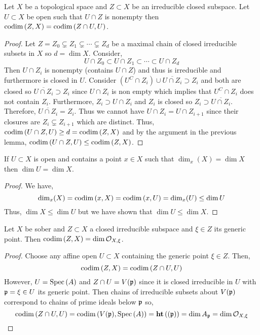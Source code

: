 \documentclass[12pt]{article}
\begin{document}
\begin{lemma}
Let $X$ be a topological space and $Z \subset X$ be an irreducible closed subspace. Let $U \subset X$ be open such that $U \cap Z$ is nonempty then $\mathrm{codim}\left( Z, X \right) = \mathrm{codim}\left( Z \cap U, U \right)$.
\end{lemma}

\begin{proof}
Let $Z = Z_0 \subsetneq Z_1 \subsetneq \cdots \subsetneq Z_d$ be a maximal chain of closed irreducible subsets in $X$ so $d = \dim{X}$. Consider,
\[ U \cap Z_0 \subset U \cap Z_1 \subset \cdots \subset U \cap Z_d \]
Then $U \cap Z_i$ is nonempty (contains $U \cap Z$) and thus is irreducible and furthermore is closed in $U$. Consider $(U^C \cap Z_i) \cup \overline{U \cap Z_i} \supset Z_i$ and both are closed so $\overline{U \cap Z_i} \supset Z_i$ since $U \cap Z_i$ is non empty which implies that $U^C \cap Z_i$ does not contain $Z_i$. Furthermore, $Z_i \supset U \cap Z_i$ and $Z_i$ is closed so $Z_i \supset \overline{U \cap Z_i}$. Therefore, $\overline{U \cap Z_i} = Z_i$. Thus we cannot have $U \cap Z_{i} = U \cap Z_{i+1}$ since their closures are $Z_i \subsetneq Z_{i+1}$ which are distinct. Thus, $\mathrm{codim}\left( U \cap Z, U \right) \ge d = \mathrm{codim}\left( Z, X \right)$ and by the argument in the previous lemma, $\mathrm{codim}\left( U \cap Z, U \right) \le \mathrm{codim}\left( Z, X \right)$.
\end{proof}

\begin{corollary}
If $U \subset X$ is open and contains a point $x \in X$ such that $\dim_x(X) = \dim{X}$ then $\dim{U} = \dim{X}$.
\end{corollary}

\begin{proof}
We have, \[ \dim_x(X) = \mathrm{codim}\left( x, X \right) = \mathrm{codim}\left( x, U \right) = \dim_x(U) \le \dim{U} \]
Thus, $\dim{X} \le \dim{U}$ but we have shown that $\dim{U} \le \dim{X}$.
\end{proof}

\begin{lemma}
Let $X$ be sober and $Z \subset X$ a closed irreducible subspace and $\xi \in Z$ its generic point. Then $\mathrm{codim}\left( Z, X \right) = \dim{\mathcal{O}_{X, \xi}}$.
\end{lemma}

\begin{proof}
Choose any affine open $U \subset X$ containing the generic point $\xi \in Z$. Then,
\[ \mathrm{codim}\left( Z, X \right) = \mathrm{codim}\left( Z \cap U, U \right) \]
However, $U = \mathrm{Spec}\left( A \right)$ and $Z \cap U = V(\mathfrak{p})$ since it is closed irreducible in $U$ with $\mathfrak{p} = \xi \in U$ its generic point. Then chains of irreducible subsets about $V(\mathfrak{p})$ correspond to chains of prime ideals below $\mathfrak{p}$ so,
\[ \mathrm{codim}\left( Z \cap U, U \right) = \mathrm{codim}\left( V(\mathfrak{p}), \mathrm{Spec}\left( A \right) \right) = \mathbf{ht}\left( (\mathfrak{p}) \right) = \dim{A_{\mathfrak{p}}} = \dim{\mathcal{O}_{X, \xi}} \]
\end{proof}
\end{document}
